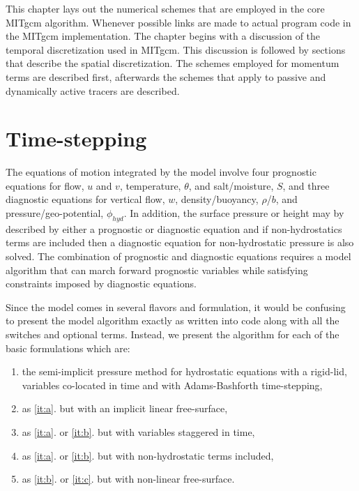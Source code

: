 
This chapter lays out the numerical schemes that are
employed in the core MITgcm algorithm. Whenever possible
links are made to actual program code in the MITgcm implementation.
The chapter begins with a discussion of the temporal discretization
used in MITgcm. This discussion is followed by sections that
describe the spatial discretization. The schemes employed for momentum
terms are described first, afterwards the schemes that apply to
passive and dynamically active tracers are described.


\section{Time-stepping}
The equations of motion integrated by the model involve four
prognostic equations for flow, $u$ and $v$, temperature, $\theta$, and
salt/moisture, $S$, and three diagnostic equations for vertical flow,
$w$, density/buoyancy, $\rho$/$b$, and pressure/geo-potential,
$\phi_{hyd}$. In addition, the surface pressure or height may by
described by either a prognostic or diagnostic equation and if
non-hydrostatics terms are included then a diagnostic equation for
non-hydrostatic pressure is also solved. The combination of prognostic
and diagnostic equations requires a model algorithm that can march
forward prognostic variables while satisfying constraints imposed by
diagnostic equations.

Since the model comes in several flavors and formulation, it would be
confusing to present the model algorithm exactly as written into code
along with all the switches and optional terms. Instead, we present
the algorithm for each of the basic formulations which are:
\begin{enumerate}
\item the semi-implicit pressure method for hydrostatic equations
with a rigid-lid, variables co-located in time and with
Adams-Bashforth time-stepping, \label{it:a}
\item as \ref{it:a}. but with an implicit linear free-surface, \label{it:b}
\item as \ref{it:a}. or \ref{it:b}. but with variables staggered in time,
\label{it:c}
\item as \ref{it:a}. or \ref{it:b}. but with non-hydrostatic terms included,
\item as \ref{it:b}. or \ref{it:c}. but with non-linear free-surface.
\end{enumerate}

